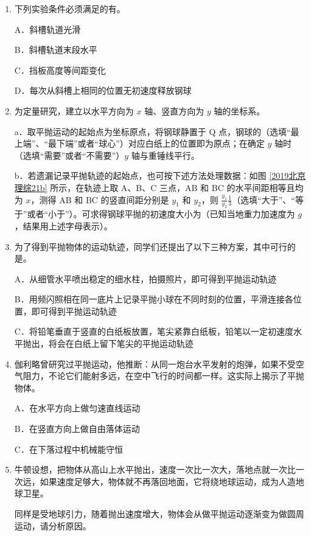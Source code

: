 \documentclass[\gkver]{gaokaozhenti}
\begin{document}
\begin{enumerate}
\begin{enumerate}
	\item
	下列实验条件必须满足的有。

	A．斜槽轨道光滑

	B．斜槽轨道末段水平

	C．挡板高度等间距变化

	D．每次从斜槽上相同的位置无初速度释放钢球

	\item
	为定量研究，建立以水平方向为 $x$ 轴、竖直方向为 $y$ 轴的坐标系。

	a．取平抛运动的起始点为坐标原点，将钢球静置于 Q 点，钢球的（选填“最上端”、“最下端”或者“球心”）对应白纸上的位置即为原点；在确定 $y$ 轴时（选填“需要”或者“不需要”）$y$ 轴与重锤线平行。

	b．若遗漏记录平抛轨迹的起始点，也可按下述方法处理数据：如图 \ref{2019北京理综21b} 所示，在轨迹上取 A、B、C 三点，AB 和 BC 的水平间距相等且均为 $x$，测得 AB 和 BC 的竖直间距分别是 $y_1$ 和 $y_2$，则 $\frac{y_1}{y_2}$$\frac{1}{3}$（选填“大于”、“等于”或者“小于”）。可求得钢球平抛的初速度大小为（已知当地重力加速度为 $g$，结果用上述字母表示）。

	\item
	为了得到平抛物体的运动轨迹，同学们还提出了以下三种方案，其中可行的是。

	A．从细管水平喷出稳定的细水柱，拍摄照片，即可得到平抛运动轨迹

	B．用频闪照相在同一底片上记录平抛小球在不同时刻的位置，平滑连接各位置，即可得到平抛运动轨迹

	C．将铅笔垂直于竖直的白纸板放置，笔尖紧靠白纸板，铅笔以一定初速度水平抛出，将会在白纸上留下笔尖的平抛运动轨迹

	\item
	伽利略曾研究过平抛运动，他推断：从同一炮台水平发射的炮弹，如果不受空气阻力，不论它们能射多远，在空中飞行的时间都一样。这实际上揭示了平抛物体。

	A．在水平方向上做匀速直线运动

	B．在竖直方向上做自由落体运动

	C．在下落过程中机械能守恒

	\item
	牛顿设想，把物体从高山上水平抛出，速度一次比一次大，落地点就一次比一次远，如果速度足够大，物体就不再落回地面，它将绕地球运动，成为人造地球卫星。

	同样是受地球引力，随着抛出速度增大，物体会从做平抛运动逐渐变为做圆周运动，请分析原因。


\end{enumerate}
\end{enumerate}
\end{document}
